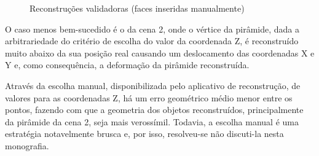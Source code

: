 		\begin{figure}[!htb]
			\centering
			\quad
			\quad
			\caption{Reconstruções validadoras (faces inseridas manualmente)}
			\label{printTestesMeshLab}
		\end{figure}
		
		O caso menos bem-sucedido é o da cena 2, onde o vértice da pirâmide, dada a arbitrariedade do critério de escolha do valor da coordenada Z, é reconstruído muito abaixo da sua posição real causando um deslocamento das coordenadas X e Y e, como consequência, a deformação da pirâmide reconstruída.
		
		Através da escolha manual, disponibilizada pelo aplicativo de reconstrução, de valores para as coordenadas Z, há um erro geométrico médio menor entre os pontos, fazendo com que a geometria dos objetos reconstruídos, principalmente da pirâmide da cena 2, seja mais verossímil. Todavia, a escolha manual é uma estratégia notavelmente brusca e, por isso, resolveu-se não discuti-la nesta monografia.
		
